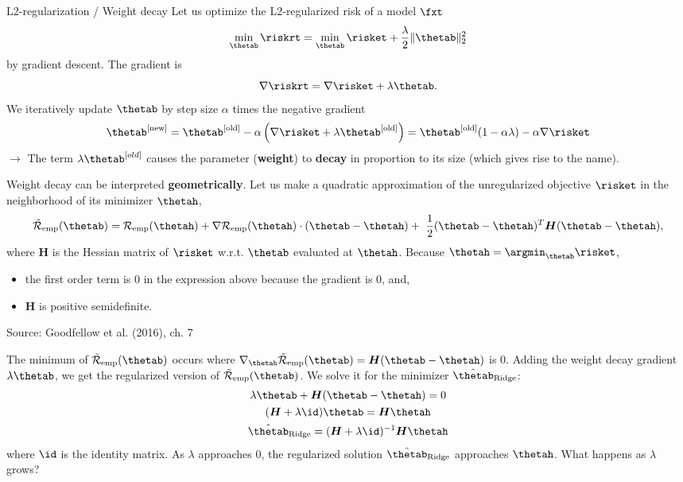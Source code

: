 \begin{vbframe}{L2-regularization / Weight decay}
Let us optimize the L2-regularized risk of a model $\fxt$
\[\min_{\thetab} \riskrt = \min_{\thetab} \risket + \frac{\lambda}{2} \|\thetab\|^2_2\]
by gradient descent. The gradient is
\[\nabla \riskrt = \nabla \risket + \lambda \thetab.\]
We iteratively update $\thetab$ by step size \(\alpha\) times the
negative gradient
\[\thetab^{[\text{new}]} = \thetab^{[\text{old}]} - \alpha \left(\nabla \risket + \lambda \thetab^{[\text{old}]}\right) =
\thetab^{[\text{old}]} (1 - \alpha \lambda) - \alpha \nabla \risket\]
$\to$ The term \(\lambda \thetab^{[old]}\) causes the parameter
(\textbf{weight}) to \textbf{decay} in proportion to its size (which gives rise to the name). 
\framebreak

Weight decay can be interpreted \textbf{geometrically}. 
\lz 
Let us make a quadratic approximation of the unregularized objective $\risket$ in the neighborhood of its minimizer $\thetah$,  
$$ \mathcal{\tilde R}_{\text{emp}}(\thetab)= \mathcal{R}_{\text{emp}}(\thetah) + \nabla \mathcal{R}_{\text{emp}}(\thetah)\cdot(\thetab - \thetah) + \ \frac{1}{2} (\thetab - \thetah)^T \bm{H} (\thetab - \thetah), $$
where $\bm{H}$ is the Hessian matrix of $\risket$ w.r.t. $\thetab$ evaluated at $\thetah$. 
\lz
Because $\thetah = \argmin_{\thetab}\risket$,
\begin{itemize}
\item the first order term is 0 in the expression above because the gradient is $0$, and,
\item $\bm{H}$ is positive semidefinite.
\end{itemize}
\lz
\tiny{Source: Goodfellow et al. (2016), ch. 7}
\framebreak

\normalsize
The minimum of $\mathcal{\tilde R}_{\text{emp}}(\thetab)$ occurs where $\nabla_{\thetab}\mathcal{\tilde R}_{\text{emp}}(\thetab) = \bm{H}(\thetab - \thetah)$ is $0$.
\lz
Adding the weight decay gradient $\lambda \thetab$, we get the regularized version of $\mathcal{\tilde R}_{\text{emp}}(\thetab)$. We solve it for the minimizer $\hat{\thetab}_{\text{Ridge}}$:
\begin{gather*}
\lambda \thetab + \bm{H}(\thetab - \thetah) = 0\\
(\bm{H} + \lambda \id) \thetab = \bm{H} \thetah \\
\hat{\thetab}_{\text{Ridge}} = (\bm{H} + \lambda \id)^{-1}\bm{H} \thetah
\end{gather*}
where $\id$ is the identity matrix.
\lz
As $\lambda$ approaches $0$, the regularized solution $\hat{\thetab}_{\text{Ridge}}$ approaches $\thetah$. What happens as $\lambda$ grows?
\framebreak


\end{vbframe}
